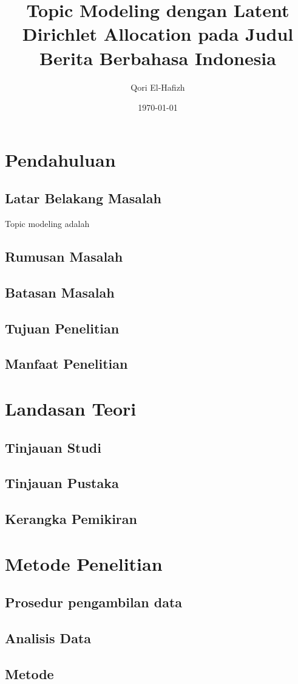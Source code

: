 \documentclass[a4paper,11pt]{report}
\title{Topic Modeling dengan Latent Dirichlet Allocation pada Judul Berita Berbahasa Indonesia}
\author{Qori El-Hafizh}
\date{\today}
\begin{document}
\maketitle

\begin{abstract}
\end{abstract}

\tableofcontents

\chapter{Pendahuluan}
\section{Latar Belakang Masalah}
Topic modeling adalah \cite{surjandari_mining_2018}
\section{Rumusan Masalah}
\section{Batasan Masalah}
\section{Tujuan Penelitian}
\section{Manfaat Penelitian}

\chapter{Landasan Teori}
\section{Tinjauan Studi}
\section{Tinjauan Pustaka}
\section{Kerangka Pemikiran}

\chapter{Metode Penelitian}
\section{Prosedur pengambilan data}
\section{Analisis Data}
\section{Metode}

\printbibliography
\end{document}
